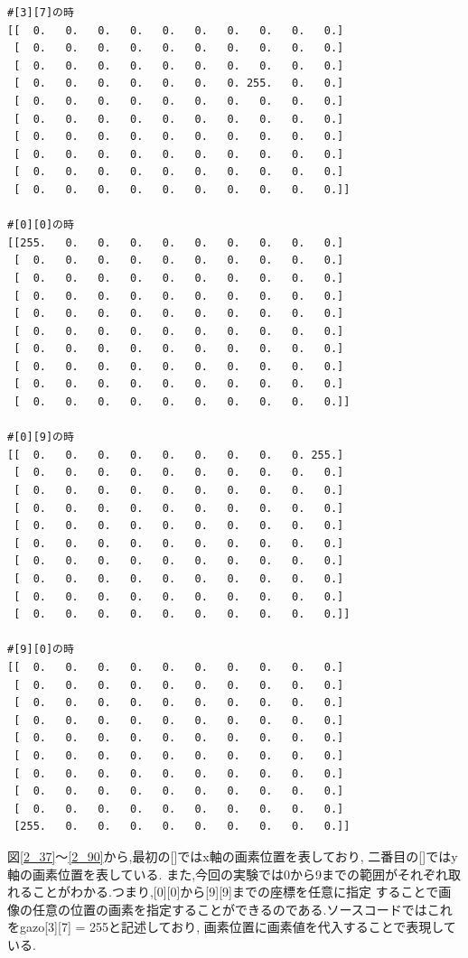 \documentclass[a4paper,11pt,uplatex, titlepage]{jsarticle}
\begin{document}
\begin{lstlisting}[basicstyle=\ttfamily\footnotesize]
#[3][7]の時
[[  0.   0.   0.   0.   0.   0.   0.   0.   0.   0.]
 [  0.   0.   0.   0.   0.   0.   0.   0.   0.   0.]
 [  0.   0.   0.   0.   0.   0.   0.   0.   0.   0.]
 [  0.   0.   0.   0.   0.   0.   0. 255.   0.   0.]
 [  0.   0.   0.   0.   0.   0.   0.   0.   0.   0.]
 [  0.   0.   0.   0.   0.   0.   0.   0.   0.   0.]
 [  0.   0.   0.   0.   0.   0.   0.   0.   0.   0.]
 [  0.   0.   0.   0.   0.   0.   0.   0.   0.   0.]
 [  0.   0.   0.   0.   0.   0.   0.   0.   0.   0.]
 [  0.   0.   0.   0.   0.   0.   0.   0.   0.   0.]]

#[0][0]の時
[[255.   0.   0.   0.   0.   0.   0.   0.   0.   0.]
 [  0.   0.   0.   0.   0.   0.   0.   0.   0.   0.]
 [  0.   0.   0.   0.   0.   0.   0.   0.   0.   0.]
 [  0.   0.   0.   0.   0.   0.   0.   0.   0.   0.]
 [  0.   0.   0.   0.   0.   0.   0.   0.   0.   0.]
 [  0.   0.   0.   0.   0.   0.   0.   0.   0.   0.]
 [  0.   0.   0.   0.   0.   0.   0.   0.   0.   0.]
 [  0.   0.   0.   0.   0.   0.   0.   0.   0.   0.]
 [  0.   0.   0.   0.   0.   0.   0.   0.   0.   0.]
 [  0.   0.   0.   0.   0.   0.   0.   0.   0.   0.]]

#[0][9]の時
[[  0.   0.   0.   0.   0.   0.   0.   0.   0. 255.]
 [  0.   0.   0.   0.   0.   0.   0.   0.   0.   0.]
 [  0.   0.   0.   0.   0.   0.   0.   0.   0.   0.]
 [  0.   0.   0.   0.   0.   0.   0.   0.   0.   0.]
 [  0.   0.   0.   0.   0.   0.   0.   0.   0.   0.]
 [  0.   0.   0.   0.   0.   0.   0.   0.   0.   0.]
 [  0.   0.   0.   0.   0.   0.   0.   0.   0.   0.]
 [  0.   0.   0.   0.   0.   0.   0.   0.   0.   0.]
 [  0.   0.   0.   0.   0.   0.   0.   0.   0.   0.]
 [  0.   0.   0.   0.   0.   0.   0.   0.   0.   0.]]

#[9][0]の時
[[  0.   0.   0.   0.   0.   0.   0.   0.   0.   0.]
 [  0.   0.   0.   0.   0.   0.   0.   0.   0.   0.]
 [  0.   0.   0.   0.   0.   0.   0.   0.   0.   0.]
 [  0.   0.   0.   0.   0.   0.   0.   0.   0.   0.]
 [  0.   0.   0.   0.   0.   0.   0.   0.   0.   0.]
 [  0.   0.   0.   0.   0.   0.   0.   0.   0.   0.]
 [  0.   0.   0.   0.   0.   0.   0.   0.   0.   0.]
 [  0.   0.   0.   0.   0.   0.   0.   0.   0.   0.]
 [  0.   0.   0.   0.   0.   0.   0.   0.   0.   0.]
 [255.   0.   0.   0.   0.   0.   0.   0.   0.   0.]]
\end{lstlisting}

図\ref{2_37}〜\ref{2_90}から,最初の[]ではx軸の画素位置を表しており, 二番目の[]ではy軸の画素位置を表している.
また,今回の実験では0から9までの範囲がそれぞれ取れることがわかる.つまり,[0][0]から[9][9]までの座標を任意に指定
することで画像の任意の位置の画素を指定することができるのである.ソースコードではこれをgazo[3][7] = 255と記述しており,
画素位置に画素値を代入することで表現している.
\end{document}
